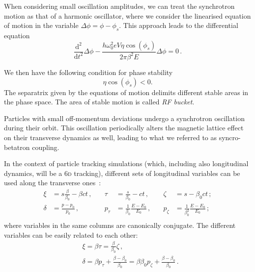 When considering small oscillation amplitudes, we can treat the synchrotron motion as that of a harmonic oscillator, where we consider the linearised equation of motion in the variable $\Delta \phi=\phi-\phi_s$. This approach leads to the differential equation
\begin{equation}
    \frac{\mathrm{d}^2}{\mathrm{d} t^2} \Delta \phi-\frac{h \omega_0^2 e V \eta \cos \left(\phi_s\right)}{2 \pi \beta^2 E} \Delta \phi=0 \,.
\end{equation}

We then have the following condition for phase stability
\begin{equation}
    \eta \cos \left(\phi_s\right)<0 .
\end{equation}
The separatrix given by the equations of motion delimits different stable areas in the phase space. The area of stable motion is called \textit{RF bucket}. %

Particles with small off-momentum deviations undergo a synchrotron oscillation during their orbit. This oscillation periodically alters the magnetic lattice effect on their transverse dynamics as well, leading to what we referred to as syncro-betatron coupling.

In the context of particle tracking simulations (which, including also longitudinal dynamics, will be a 6\textsc{d} tracking), different sets of longitudinal variables can be used along the transverse ones~\cite{xsuite:physics}:
\begin{equation}
    \begin{aligned}
    \xi &= s \frac{\beta}{\beta_0}-\beta c t \,,\quad& \tau &= \frac{s}{\beta_0}-c t \,,\quad& \zeta &= s-\beta_0 c t \,;\\
    \delta &= \frac{p-p_0}{p_0} \,,\quad& p_\tau &= \frac{1}{\beta_0} \frac{E-E_0}{E_0} \,,\quad& p_\zeta &= \frac{1}{\beta_0^2} \frac{E-E_0}{E_0}\,; \\
    \end{aligned}
\end{equation}
where variables in the same columns are canonically conjugate.
The different variables can be easily related to each other:
\begin{equation}
    \begin{aligned}
    &\xi=\beta \tau=\frac{\beta}{\beta_0} \zeta \,,\\
    &\delta=\beta p_\tau+\frac{\beta-\beta_0}{\beta_0}=\beta \beta_0 p_\zeta+\frac{\beta-\beta_0}{\beta_0} \,.
    \end{aligned}
\end{equation}

